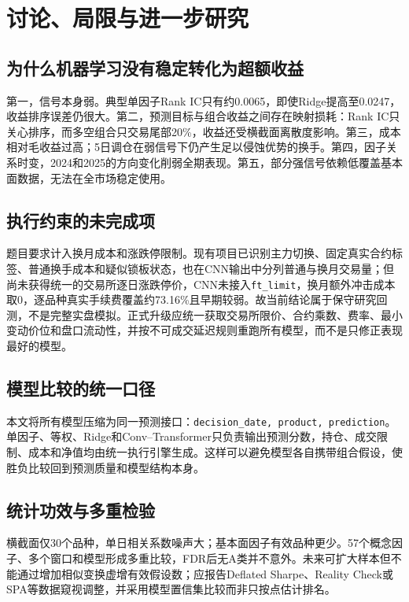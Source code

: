 \documentclass[UTF8,zihao=-4,fontset=ubuntu]{ctexart}
\newcommand{\code}[1]{\texttt{#1}}
\begin{document}
\section{讨论、局限与进一步研究}

\subsection{为什么机器学习没有稳定转化为超额收益}

第一，信号本身弱。典型单因子Rank IC只有约0.0065，即使Ridge提高至0.0247，收益排序误差仍很大。第二，预测目标与组合收益之间存在映射损耗：Rank IC只关心排序，而多空组合只交易尾部20\%，收益还受横截面离散度影响。第三，成本相对毛收益过高；5日调仓在弱信号下仍产生足以侵蚀优势的换手。第四，因子关系时变，2024和2025的方向变化削弱全期表现。第五，部分强信号依赖低覆盖基本面数据，无法在全市场稳定使用。

\subsection{执行约束的未完成项}

题目要求计入换月成本和涨跌停限制。现有项目已识别主力切换、固定真实合约标签、普通换手成本和疑似锁板状态，也在CNN输出中分列普通与换月交易量；但尚未获得统一的交易所逐日涨跌停价，CNN未接入\code{ft\_limit}，换月额外冲击成本取0，逐品种真实手续费覆盖约73.16\%且早期较弱。故当前结论属于保守研究回测，不是完整实盘模拟。正式升级应统一获取交易所限价、合约乘数、费率、最小变动价位和盘口流动性，并按不可成交延迟规则重跑所有模型，而不是只修正表现最好的模型。

\subsection{模型比较的统一口径}

本文将所有模型压缩为同一预测接口：\code{decision\_date, product, prediction}。单因子、等权、Ridge和Conv--Transformer只负责输出预测分数，持仓、成交限制、成本和净值均由统一执行引擎生成。这样可以避免模型各自携带组合假设，使胜负比较回到预测质量和模型结构本身。

\subsection{统计功效与多重检验}

横截面仅30个品种，单日相关系数噪声大；基本面因子有效品种更少。57个概念因子、多个窗口和模型形成多重比较，FDR后无A类并不意外。未来可扩大样本但不能通过增加相似变换虚增有效假设数；应报告Deflated Sharpe、Reality Check或SPA等数据窥视调整，并采用模型置信集比较而非只按点估计排名。
\end{document}
